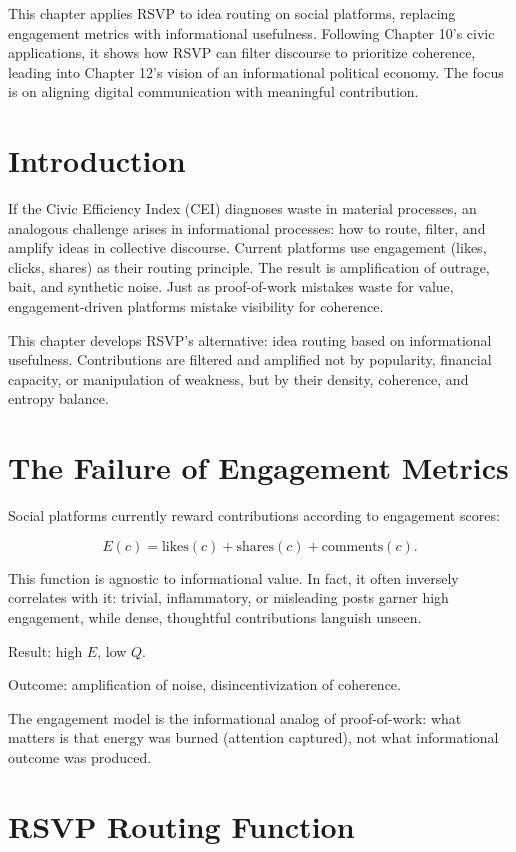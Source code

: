 \documentclass{book}
\begin{document}
This chapter applies RSVP to idea routing on social platforms, replacing engagement metrics with informational usefulness. Following Chapter 10’s civic applications, it shows how RSVP can filter discourse to prioritize coherence, leading into Chapter 12’s vision of an informational political economy. The focus is on aligning digital communication with meaningful contribution.

\section{Introduction}

If the Civic Efficiency Index (CEI) diagnoses waste in material processes, an analogous challenge arises in informational processes: how to route, filter, and amplify ideas in collective discourse. Current platforms use engagement (likes, clicks, shares) as their routing principle. The result is amplification of outrage, bait, and synthetic noise. Just as proof-of-work mistakes waste for value, engagement-driven platforms mistake visibility for coherence.

This chapter develops RSVP’s alternative: idea routing based on informational usefulness. Contributions are filtered and amplified not by popularity, financial capacity, or manipulation of weakness, but by their density, coherence, and entropy balance.

\section{The Failure of Engagement Metrics}

Social platforms currently reward contributions according to engagement scores:

\[ E(c) = \text{likes}(c) + \text{shares}(c) + \text{comments}(c). \]

This function is agnostic to informational value. In fact, it often inversely correlates with it: trivial, inflammatory, or misleading posts garner high engagement, while dense, thoughtful contributions languish unseen.

Result: high \( E \), low \( Q \).

Outcome: amplification of noise, disincentivization of coherence.

The engagement model is the informational analog of proof-of-work: what matters is that energy was burned (attention captured), not what informational outcome was produced.

\section{RSVP Routing Function}
\end{document}
